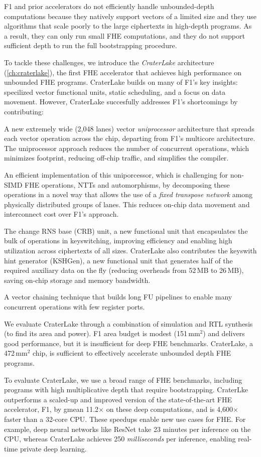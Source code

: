 F1 and prior accelerators do not efficiently handle unbounded-depth
computations because they natively support vectors of a limited size and they
use algorithms that scale poorly to the large ciphertexts in high-depth
programs. As a result, they can only run small FHE computations, and they do
not support sufficient depth to run the full bootstrapping procedure.

To tackle these challenges, we introduce the \emph{CraterLake} architecture
(\autoref{ch:craterlake}), the first FHE accelerator
that achieves high performance on unbounded FHE programs. CraterLake builds on
many of F1's key insights: specilized vector functional units, static
scheduling, and a focus on data movement. However, CraterLake succesfully
addresses F1's shortcomings by contributing:
\begin{compactitem}
\item A new extremely wide (2,048 lanes) vector \emph{uniprocessor}
    architecture that spreads each vector operation across the chip, departing
    from F1's multicore architecture. The uniprocessor approach reduces the
    number of concurrent operations, which minimizes footprint, reducing
    off-chip traffic, and simplifies the compiler.
\item An efficient implementation of this uniporcessor, which is
    challenging for non-SIMD FHE operations, NTTs and automorphisms, by
    decomposing these operations in a novel way that allows the use of a
    \emph{fixed transpose network} among physically distributed groups of
    lanes. This reduces on-chip data movement and interconnect cost over F1's
    approach.
\item The change RNS base (CRB) unit, a new functional unit that encapsulates
    the bulk of operations in keyswitching, improving efficiency and
    enabling high utilization across ciphertexts of all sizes. CraterLake also
    contributes the keyswith hint generator (KSHGen), a new functional unit
    that generates half of the required auxiliary data on the fly (reducing
    overheads from 52\,MB to 26\,MB), saving on-chip storage and memory
    bandwidth.
\item A vector chaining technique that builds long FU pipelines to enable many
    concurrent operations with few register ports.
\end{compactitem}

We evaluate CraterLake through a combination of simulation and RTL synthesis
(to find its area and power). F1 area budget is modest (151\,mm$^2$) and
delivers good performance, but it is insufficient for deep FHE benchmarks.
CraterLake, a 472\,mm$^2$ chip, is sufficient to effectively accelerate
unbounded depth FHE programs.

To evaluate CraterLake, we use a broad range of FHE benchmarks, including
programs with high multiplicative depth that require bootstrapping. CraterLke
outperforms a scaled-up and improved version of the state-of-the-art FHE
accelerator, F1, by gmean 11.2$\times$ on these deep computations, and is
4,600$\times$ faster than a 32-core CPU. These speedups enable new use cases
for FHE. For example, deep neural networks like ResNet take 23 minutes per
inference on the CPU, whereas CraterLake achieves 250 \emph{milliseconds} per
inference, enabling real-time private deep learning.
